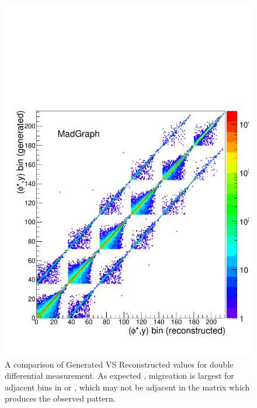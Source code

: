 \begin{figure}
    \centering
    \includegraphics[width=\linewidth]{figures/Simulation/GenRecoTwoDTwoDPlot.pdf}
    \caption[\rapidity and \phistar unfolding matrix]{A comparison of Generated VS Reconstructed values for double differential measurement. As expected , migreation is largest for adjacent bins in \phistar or \rapidity, which may not be adjacent in the matrix which produces the observed pattern.}
    \label{fig:2DBinMigration}
\end{figure}




